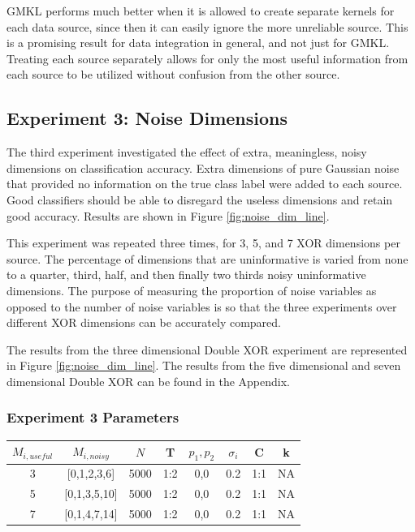 \documentclass{article}
\begin{document}
GMKL performs much better when it is allowed to create separate kernels for
each data source, since then it can easily ignore the more unreliable source.
This is a promising result for data integration in general, and not just for
GMKL. Treating each source separately allows for only the most useful
information from each source to be utilized without confusion from the other
source.



\subsection*{Experiment 3: Noise Dimensions}

The third experiment investigated the effect of extra, meaningless, noisy
dimensions on classification accuracy. Extra dimensions of pure Gaussian noise
that provided no information on the true class label were added to each source.
Good classifiers should be able to disregard the useless dimensions and retain
good accuracy. Results are shown in Figure \ref{fig:noise_dim_line}.

This experiment was repeated three times, for 3, 5, and 7 XOR dimensions per
source. The percentage of dimensions that are uninformative is varied from none
to a quarter, third, half, and then finally two thirds noisy uninformative
dimensions. The purpose of measuring the proportion of noise variables as
opposed to the number of noise variables is so that the three experiments over
different XOR dimensions can be accurately compared.

The results from the three dimensional Double XOR experiment are represented in
Figure \ref{fig:noise_dim_line}. The results from the five dimensional and
seven dimensional Double XOR can be found in the Appendix.


\begin{minipage}{\textwidth}
\centering
\subsubsection*{Experiment 3 Parameters}
\begin{tabular}{|c|c|c|c|c|c|c|c|}
\hline
$M_{i,useful}$ & $M_{i, noisy}$ & $N$ & T &  $p_1, p_2$ & $\sigma_i$ & C &  k  \\
\hline
3& [0,1,2,3,6] & 5000 &1:2 & 0,0 & 0.2 & 1:1 & NA  \\
\hline
5& [0,1,3,5,10] & 5000 &1:2 & 0,0 & 0.2 & 1:1 & NA  \\
\hline
7& [0,1,4,7,14] & 5000 &1:2 & 0,0 & 0.2 & 1:1 & NA  \\
\hline
\end{tabular}
\label{tab:exp_3_params}
\end{minipage}
\end{document}
